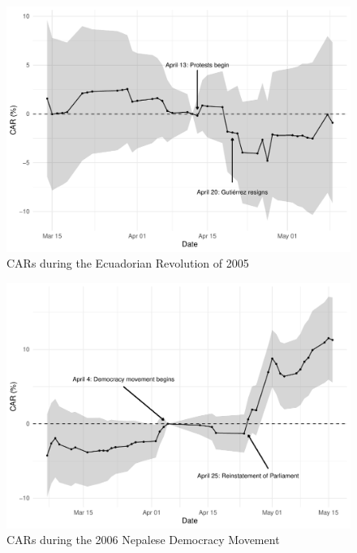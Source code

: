 \documentclass[12pt,final,fleqn]{article}
\theoremstyle{plain}
\begin{document}
\begin{figure}[!ht]
\centering
\includegraphics[scale=0.8]{../figs/ecuador-2005.pdf}
\caption{CARs during the Ecuadorian Revolution of 2005}
\label{fig:CAR-Egypt}
\end{figure}

\begin{figure}[!ht]
\centering
\includegraphics[scale=0.8]{../figs/nepal-2006.pdf}
\caption{CARs during the 2006 Nepalese Democracy Movement}
\label{fig:CAR-Egypt}
\end{figure}
\end{document}
